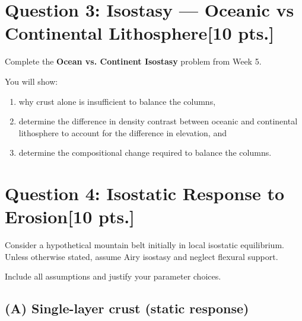 \documentclass[11pt,a4paper,final]{article}
\begin{document}


\clearpage
\section*{Question 3: Isostasy — Oceanic vs Continental Lithosphere\hfill [10 pts.]}

Complete the \textbf{Ocean vs. Continent Isostasy} problem from Week 5.

You will show:
\begin{enumerate}
    \item why crust alone is insufficient to balance the columns,
    \item determine the difference in density contrast between oceanic and continental lithosphere to account for the difference in elevation, and
    \item determine the compositional change required to balance the columns.
\end{enumerate}

\clearpage
\section*{Question 4: Isostatic Response to Erosion\hfill [10 pts.]}

Consider a hypothetical mountain belt initially in local isostatic equilibrium.
Unless otherwise stated, assume Airy isostasy and neglect flexural support.

Include all assumptions and justify your parameter choices.

\subsection*{(A) Single-layer crust (static response)}
\end{document}
